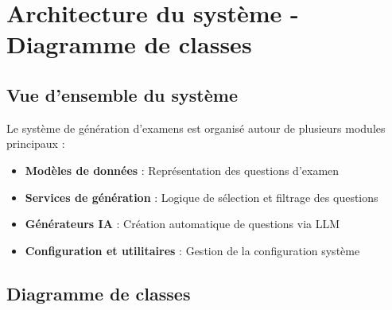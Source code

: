 \documentclass{report}
\begin{document}
\chapter{Architecture du système - Diagramme de classes}

\section{Vue d'ensemble du système}

Le système de génération d'examens est organisé autour de plusieurs modules principaux :
\begin{itemize}
    \item \textbf{Modèles de données} : Représentation des questions d'examen
    \item \textbf{Services de génération} : Logique de sélection et filtrage des questions
    \item \textbf{Générateurs IA} : Création automatique de questions via LLM
    \item \textbf{Configuration et utilitaires} : Gestion de la configuration système
\end{itemize}

\section{Diagramme de classes}
\end{document}

